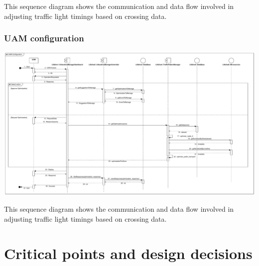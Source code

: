 \documentclass[12pt, a4paper, twoside, openright]{report}
\begin{document}
This sequence diagram shows the communication and data flow involved in
adjusting traffic light timings based on crossing data.


\subsubsection{UAM configuration}

\includegraphics[width=\linewidth]{images/svg/uam_configuration.pdf}

This sequence diagram shows the communication and data flow involved in
adjusting traffic light timings based on crossing data.


\section{Critical points and design decisions}
\end{document}
